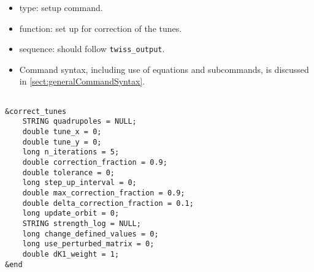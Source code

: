 \documentclass[11pt]{article}
\begin{document}
\begin{itemize}
\item type: setup command.
\item function: set up for correction of the tunes.
\item sequence: should follow \verb|twiss_output|.
\item Command syntax, including use of equations and subcommands, is discussed in \ref{sect:generalCommandSyntax}.
\end{itemize}

\begin{verbatim}

&correct_tunes
    STRING quadrupoles = NULL;
    double tune_x = 0;
    double tune_y = 0;
    long n_iterations = 5;
    double correction_fraction = 0.9;
    double tolerance = 0;
    long step_up_interval = 0;
    double max_correction_fraction = 0.9;
    double delta_correction_fraction = 0.1;
    long update_orbit = 0;
    STRING strength_log = NULL;
    long change_defined_values = 0;
    long use_perturbed_matrix = 0;
    double dK1_weight = 1;
&end
\end{verbatim}
\end{document}
